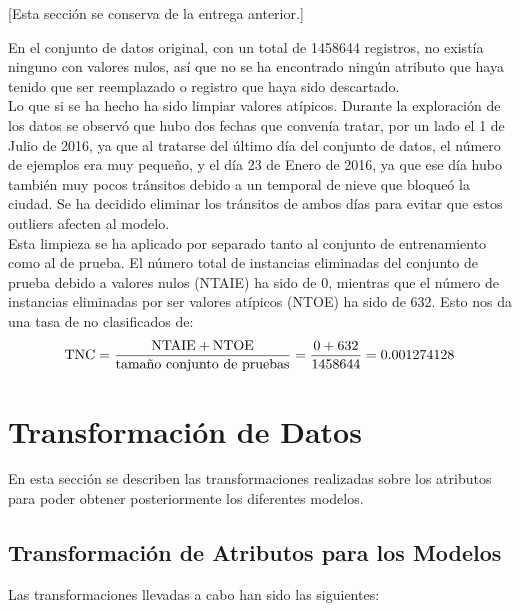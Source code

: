 \documentclass[12pt]{article}
\begin{document}
[Esta sección se conserva de la entrega anterior.]

En el conjunto de datos original, con un total de 1458644 registros, no existía ninguno con valores nulos, así que no se ha encontrado ningún atributo que haya tenido que ser reemplazado o registro que haya sido descartado.\\

Lo que si se ha hecho ha sido limpiar valores atípicos. Durante la exploración de los datos se observó que hubo dos fechas que convenía tratar, por un lado el 1 de Julio de 2016, ya que al tratarse del último día del conjunto de datos, el número de ejemplos era muy pequeño, y el día 23 de Enero de 2016, ya que ese día hubo también muy pocos tránsitos debido a un temporal de nieve que bloqueó la ciudad. Se ha decidido eliminar los tránsitos de ambos días para evitar que estos outliers afecten al modelo.\\

Esta limpieza se ha aplicado por separado tanto al conjunto de entrenamiento como al de prueba. El número total de instancias eliminadas del conjunto de prueba debido a valores nulos (NTAIE) ha sido de 0, mientras que el número de instancias eliminadas por ser valores atípicos (NTOE) ha sido de 632. Esto nos da una tasa de no clasificados de:\\

\begin{equation}
    \textnormal{TNC} = \frac{\text{NTAIE} + \text{NTOE}}{\textnormal{tamaño conjunto de pruebas}} = \frac{0 + 632}{1458644} = 0.001274128
    \label{eq:tasa-no-clasificados}
\end{equation}

\section{Transformación de Datos}
En esta sección se describen las transformaciones realizadas sobre los atributos para poder obtener posteriormente los diferentes modelos.\\

\subsection{Transformación de Atributos para los Modelos}

Las transformaciones llevadas a cabo han sido las siguientes:
\end{document}
